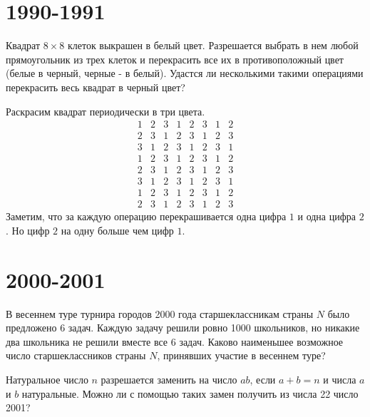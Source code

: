 \documentclass[11pt, a4paper]{template}
\begin{document}
\chapter{1990-1991}

\begin{exercise}
Квадрат $8 \times 8$ клеток выкрашен в белый цвет. Разрешается выбрать в нем любой прямоугольник из трех клеток и перекрасить все их в противоположный цвет (белые в черный, черные - в белый). Удастся ли несколькими такими операциями перекрасить весь квадрат в черный цвет?
\end{exercise}

\begin{solution}
Раскрасим квадрат периодически в три цвета.
$$
\begin{matrix}
1 & 2 & 3 & 1 & 2 & 3 & 1 & 2 \\
2 & 3 & 1 & 2 & 3 & 1 & 2 & 3 \\
3 & 1 & 2 & 3 & 1 & 2 & 3 & 1 \\
1 & 2 & 3 & 1 & 2 & 3 & 1 & 2 \\
2 & 3 & 1 & 2 & 3 & 1 & 2 & 3 \\
3 & 1 & 2 & 3 & 1 & 2 & 3 & 1 \\ 
1 & 2 & 3 & 1 & 2 & 3 & 1 & 2 \\
2 & 3 & 1 & 2 & 3 & 1 & 2 & 3 
\end{matrix}
$$
Заметим, что за каждую операцию перекрашивается одна цифра $1$ и одна цифра $2$. Но цифр $2$ на одну больше чем цифр $1$. 
\end{solution}

\chapter{2000-2001}

\begin{exercise}
В весеннем туре турнира городов 2000 года старшеклассникам страны $N$ было предложено 6 задач. Каждую задачу решили ровно 1000 школьников, но никакие два школьника не решили вместе все 6 задач. Каково наименьшее возможное число старшеклассников страны $N$, принявших участие в весеннем туре?
\end{exercise}

\begin{exercise}
Натуральное число $n$ разрешается заменить на число $ab$, если $a + b = n$ и числа $a$ и $b$ натуральные. Можно ли с помощью таких замен получить из числа 22 число 2001?
\end{exercise}
\end{document}
